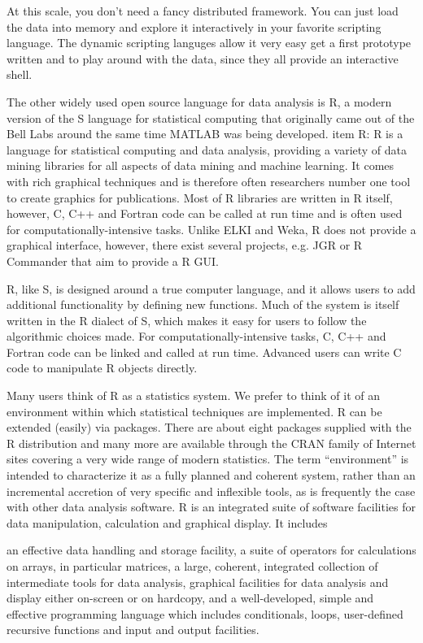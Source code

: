 At this scale, you don’t need a fancy distributed framework. You can just load the data into memory and explore it interactively in your favorite scripting language. The dynamic scripting languges allow it very easy get a first prototype written and to play around with the data, since they all provide an interactive shell.

The other widely used open source language for data analysis is R, a modern version of the S language for statistical computing that originally came out of the Bell Labs around the same time MATLAB was being developed.
item R: R is a language for statistical computing and data analysis, providing a variety of data mining libraries for all aspects of data mining and machine learning. It comes with rich graphical techniques and is therefore often researchers number one tool to create graphics for publications. Most of R libraries are written in R itself, however, C, C++ and Fortran code can be called at run time and is often used for computationally-intensive tasks. Unlike ELKI and Weka, R does not provide a graphical interface, however, there exist several projects, e.g. JGR or R Commander that aim to provide a R GUI.

R, like S, is designed around a true computer language, and it allows users to add additional functionality by defining new functions. Much of the system is itself written in the R dialect of S, which makes it easy for users to follow the algorithmic choices made. For computationally-intensive tasks, C, C++ and Fortran code can be linked and called at run time. Advanced users can write C code to manipulate R objects directly.

Many users think of R as a statistics system. We prefer to think of it of an environment within which statistical techniques are implemented. R can be extended (easily) via packages. There are about eight packages supplied with the R distribution and many more are available through the CRAN family of Internet sites covering a very wide range of modern statistics.
The term “environment” is intended to characterize it as a fully planned and coherent system, rather than an incremental accretion of very specific and inflexible tools, as is frequently the case with other data analysis software.
R is an integrated suite of software facilities for data manipulation, calculation and graphical display. It includes

an effective data handling and storage facility,
a suite of operators for calculations on arrays, in particular matrices,
a large, coherent, integrated collection of intermediate tools for data analysis,
graphical facilities for data analysis and display either on-screen or on hardcopy, and
a well-developed, simple and effective programming language which includes conditionals, loops, user-defined recursive functions and input and output facilities.

